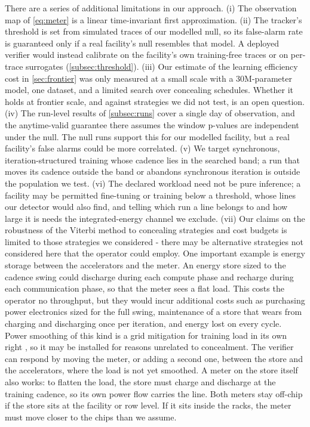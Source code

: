 \documentclass{article}
\begin{document}
There are a series of additional limitations in our approach. (i) The observation map of \cref{eq:meter} is a
linear time-invariant first approximation. (ii) The tracker's threshold is set from simulated traces of our modelled null, so its false-alarm rate is guaranteed only if a real facility's null resembles that
model. A deployed verifier would instead calibrate on the facility's own
training-free traces or on per-trace surrogates (\cref{subsec:threshold}). (iii) Our estimate of the learning efficiency cost in \cref{sec:frontier} was only measured at a small scale with a $30$M-parameter model, one dataset, and
a limited search over concealing schedules. Whether
it holds at frontier scale, and against strategies we did not test, is an open question. (iv) The run-level results of \cref{subsec:runs} cover a single day of observation, and the
anytime-valid guarantee there assumes the window p-values are independent under
the null. The null runs support this for our modelled facility, but a real
facility's false alarms could be more correlated. (v) We target synchronous, iteration-structured training whose cadence lies in the searched band; a run that
moves its cadence outside the band or abandons synchronous iteration is outside
the population we test. (vi) The declared workload need not be pure inference; a facility may be permitted fine-tuning or training below a threshold, whose lines our detector would also find, and telling which run a line belongs to and how large it is needs the integrated-energy channel we exclude. (vii) Our claims on the robustness of the Viterbi method to concealing strategies and cost budgets is limited to those strategies we considered - there may be alternative strategies not considered here that the operator could employ. One important example  is energy storage between the accelerators and the meter. An energy store sized to the cadence swing could discharge during each compute phase and recharge during each communication phase, so that the meter sees a flat load. This costs the
operator no throughput, but they would incur additional costs such as purchasing power electronics sized for the full swing, maintenance of a store that wears from charging and
discharging once per iteration, and energy lost on every cycle.
Power smoothing of this kind is a grid mitigation for training load in its own
right \citep{ko2025widearea}, so it may be installed for reasons unrelated to
concealment. The verifier can respond by moving the meter, or adding a second one, between the
store and the accelerators, where the load is not yet smoothed. A meter on the
store itself also works: to flatten the load, the store must charge and discharge
at the training cadence, so its own power flow carries the line. Both meters stay
off-chip if the store sits at the facility or row level. If it sits inside the
racks, the meter must move closer to the chips than we assume.
\end{document}
